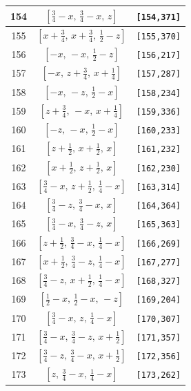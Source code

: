 \documentclass[fleqn,8pt]{jsarticle}
\begin{document}
\begin{longtable}{ccc}
154 & $\left[ \frac{3}{4} - x,\, \frac{3}{4} - x,\, z \right]$ & {\tt [154,371]} \\ \hline
155 & $\left[ x + \frac{3}{4},\, x + \frac{3}{4},\, \frac{1}{2} - z \right]$ & {\tt [155,370]} \\ \hline
156 & $\left[ - x,\, - x,\, \frac{1}{2} - z \right]$ & {\tt [156,217]} \\ \hline
157 & $\left[ - x,\, z + \frac{3}{4},\, x + \frac{1}{4} \right]$ & {\tt [157,287]} \\ \hline
158 & $\left[ - x,\, - z,\, \frac{1}{2} - x \right]$ & {\tt [158,234]} \\ \hline
159 & $\left[ z + \frac{3}{4},\, - x,\, x + \frac{1}{4} \right]$ & {\tt [159,336]} \\ \hline
160 & $\left[ - z,\, - x,\, \frac{1}{2} - x \right]$ & {\tt [160,233]} \\ \hline
161 & $\left[ z + \frac{1}{2},\, x + \frac{1}{2},\, x \right]$ & {\tt [161,232]} \\ \hline
162 & $\left[ x + \frac{1}{2},\, z + \frac{1}{2},\, x \right]$ & {\tt [162,230]} \\ \hline
163 & $\left[ \frac{3}{4} - x,\, z + \frac{1}{2},\, \frac{1}{4} - x \right]$ & {\tt [163,314]} \\ \hline
164 & $\left[ \frac{3}{4} - z,\, \frac{3}{4} - x,\, x \right]$ & {\tt [164,364]} \\ \hline
165 & $\left[ \frac{3}{4} - x,\, \frac{3}{4} - z,\, x \right]$ & {\tt [165,363]} \\ \hline
166 & $\left[ z + \frac{1}{2},\, \frac{3}{4} - x,\, \frac{1}{4} - x \right]$ & {\tt [166,269]} \\ \hline
167 & $\left[ x + \frac{1}{2},\, \frac{3}{4} - z,\, \frac{1}{4} - x \right]$ & {\tt [167,277]} \\ \hline
168 & $\left[ \frac{3}{4} - z,\, x + \frac{1}{2},\, \frac{1}{4} - x \right]$ & {\tt [168,327]} \\ \hline
169 & $\left[ \frac{1}{2} - x,\, \frac{1}{2} - x,\, - z \right]$ & {\tt [169,204]} \\ \hline
170 & $\left[ \frac{3}{4} - x,\, z,\, \frac{1}{4} - x \right]$ & {\tt [170,307]} \\ \hline
171 & $\left[ \frac{3}{4} - x,\, \frac{3}{4} - z,\, x + \frac{1}{2} \right]$ & {\tt [171,357]} \\ \hline
172 & $\left[ \frac{3}{4} - z,\, \frac{3}{4} - x,\, x + \frac{1}{2} \right]$ & {\tt [172,356]} \\ \hline
173 & $\left[ z,\, \frac{3}{4} - x,\, \frac{1}{4} - x \right]$ & {\tt [173,262]} \\ \hline

\end{longtable}
\end{document}
